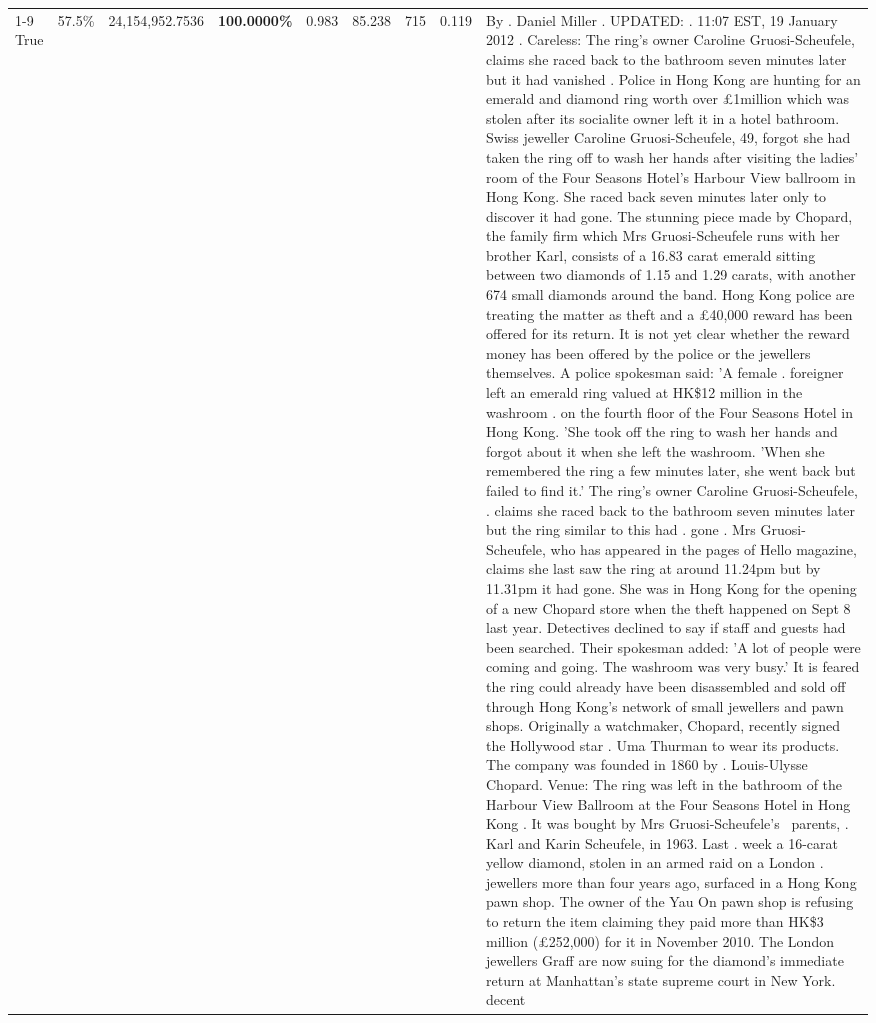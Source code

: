 \begin{table}[H]
\begin{tabular}{lllrlllll}
\cline{1-9} \cline{2-9}
True & 57.5\% & 24,154,952.7536 & \bfseries \color{red} 100.0000\% & 0.983 & 85.238 & 715 & 0.119 & By . Daniel Miller . UPDATED: . 11:07 EST, 19 January 2012 . Careless: The ring's owner Caroline Gruosi-Scheufele, claims she raced back to the bathroom seven minutes later but it had vanished . Police in Hong Kong are hunting for an emerald and diamond ring worth over £1million which was stolen after its socialite owner left it in a hotel bathroom. Swiss jeweller Caroline Gruosi-Scheufele, 49, forgot she had taken the ring off to wash her hands after visiting the ladies' room of the Four Seasons Hotel's Harbour View ballroom in Hong Kong. She raced back seven minutes later only to discover it had gone. The stunning piece made by Chopard, the family firm which Mrs Gruosi-Scheufele runs with her brother Karl, consists of a 16.83 carat emerald sitting between two diamonds of 1.15 and 1.29 carats, with another 674 small diamonds around the band. Hong Kong police are treating the matter as theft and a £40,000 reward has been offered for its return. It is not yet clear whether the reward money has been offered by the police or the jewellers themselves. A police spokesman said: 'A female . foreigner left an emerald ring valued at HK\$12 million in the washroom . on the fourth floor of the Four Seasons Hotel in Hong Kong. 'She took off the ring to wash her hands and forgot about it when she left the washroom. 'When she remembered the ring a few minutes later, she went back but failed to find it.' The ring's owner Caroline Gruosi-Scheufele, . claims she raced back to the bathroom seven minutes later but the ring similar to this had . gone . Mrs Gruosi-Scheufele, who has appeared in the pages of Hello magazine, claims she last saw the ring at around 11.24pm but by 11.31pm it had gone. She was in Hong Kong for the opening of a new Chopard store when the theft happened on Sept 8 last year. Detectives declined to say if staff and guests had been searched. Their spokesman added: 'A lot of people were coming and going. The washroom was very busy.' It is feared the ring could already have been disassembled and sold off through Hong Kong's network of small jewellers and pawn shops. Originally a watchmaker, Chopard, recently signed the Hollywood star . Uma Thurman to wear its products. The company was founded in 1860 by . Louis-Ulysse Chopard. Venue: The ring was left in the bathroom of the Harbour View Ballroom at the Four Seasons Hotel in Hong Kong . It was bought by Mrs Gruosi-Scheufele's  parents, . Karl and Karin Scheufele, in 1963. Last . week a 16-carat yellow diamond, stolen in an armed raid on a London . jewellers more than four years ago, surfaced in a Hong Kong pawn shop. The owner of the Yau On pawn shop is refusing to return the item claiming they paid more than HK\$3 million (£252,000) for it in November 2010. The London jewellers Graff are now suing for the diamond’s immediate return at Manhattan’s state supreme court in New York. decent \\

\end{tabular}
\end{table}
